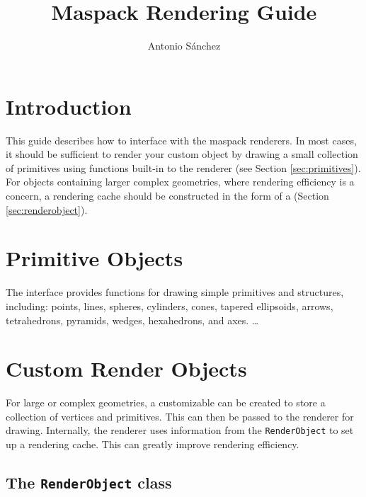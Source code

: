 \documentclass{article}
\title{Maspack Rendering Guide}
\author{Antonio S\'anchez}
\date{}
\begin{document}
\maketitle

\iflatexml{\large\pubdate}\fi

\tableofcontents


\section{Introduction}

This guide describes how to interface with the maspack renderers.  In most cases,
it should be sufficient to render your custom object by drawing a small collection of 
primitives using functions built-in to the renderer (see Section \ref{sec:primitives}).
For objects containing larger complex geometries, where rendering efficiency
is a concern, a rendering cache should be constructed in the form of a 
 (Section \ref{sec:renderobject}).

\section{Primitive Objects \label{sec:primitives}}

The  interface provides functions for drawing simple
primitives and structures, including: points, lines, spheres, cylinders,
cones, tapered ellipsoids, arrows, tetrahedrons, pyramids, wedges, hexahedrons,
and axes.  \ldots

\section{Custom Render Objects}

For large or complex geometries, a customizable  can be 
created to store a collection of vertices and primitives.  This can then be
passed to the renderer for drawing.  Internally, the renderer uses information
from the \lstinline{RenderObject} to set up a rendering cache.  This can greatly improve
rendering efficiency.

\subsection{The \texttt{RenderObject} class \label{sec:renderobject}}
\end{document}
